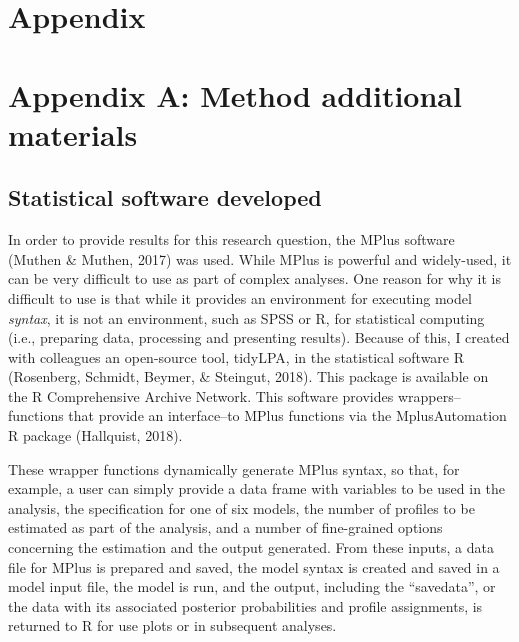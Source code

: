 \documentclass[]{msu-thesis}
\theoremstyle{definition}
\theoremstyle{definition}
\theoremstyle{definition}
\theoremstyle{remark}
\begin{document}
\section{Appendix}\label{appendix}

\section{Appendix A: Method additional
materials}\label{appendix-a-method-additional-materials}

\subsection{Statistical software
developed}\label{statistical-software-developed-1}

In order to provide results for this research question, the MPlus
software (Muthen \& Muthen, 2017) was used. While MPlus is powerful and
widely-used, it can be very difficult to use as part of complex
analyses. One reason for why it is difficult to use is that while it
provides an environment for executing model \emph{syntax}, it is not an
environment, such as SPSS or R, for statistical computing (i.e.,
preparing data, processing and presenting results). Because of this, I
created with colleagues an open-source tool, tidyLPA, in the statistical
software R (Rosenberg, Schmidt, Beymer, \& Steingut, 2018). This package
is available on the R Comprehensive Archive Network. This software
provides wrappers--functions that provide an interface--to MPlus
functions via the MplusAutomation R package (Hallquist, 2018).

These wrapper functions dynamically generate MPlus syntax, so that, for
example, a user can simply provide a data frame with variables to be
used in the analysis, the specification for one of six models, the
number of profiles to be estimated as part of the analysis, and a number
of fine-grained options concerning the estimation and the output
generated. From these inputs, a data file for MPlus is prepared and
saved, the model syntax is created and saved in a model input file, the
model is run, and the output, including the ``savedata'', or the data
with its associated posterior probabilities and profile assignments, is
returned to R for use plots or in subsequent analyses.
\end{document}
